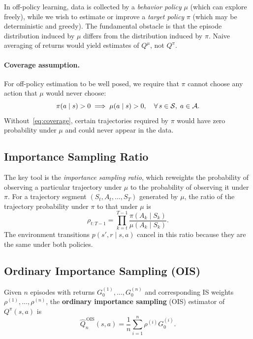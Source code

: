 In off-policy learning, data is collected by a \emph{behavior policy} $\mu$ (which can explore freely), while we wish to estimate or improve a \emph{target policy} $\pi$ (which may be deterministic and greedy).  The fundamental obstacle is that the episode distribution induced by $\mu$ differs from the distribution induced by $\pi$.  Naive averaging of returns would yield estimates of $Q^\mu$, not $Q^\pi$.

\paragraph{Coverage assumption.}
For off-policy estimation to be well posed, we require that $\pi$ cannot choose any action that $\mu$ would never choose:
\begin{equation}
  \label{eq:coverage}
  \pi(a \mid s) > 0 \implies \mu(a \mid s) > 0, \quad \forall\, s \in \mathcal{S},\; a \in \mathcal{A}.
\end{equation}
Without~\eqref{eq:coverage}, certain trajectories required by $\pi$ would have zero probability under $\mu$ and could never appear in the data.

\subsection*{Importance Sampling Ratio}

The key tool is the \emph{importance sampling ratio}, which reweights the probability of observing a particular trajectory under $\mu$ to the probability of observing it under $\pi$.  For a trajectory segment $(S_t, A_t, \dots, S_T)$ generated by $\mu$, the ratio of the trajectory probability under $\pi$ to that under $\mu$ is
\begin{equation}
  \label{eq:is-ratio}
  \rho_{t:T-1} = \prod_{k=t}^{T-1} \frac{\pi(A_k \mid S_k)}{\mu(A_k \mid S_k)}.
\end{equation}
The environment transitions $p(s', r \mid s, a)$ cancel in this ratio because they are the same under both policies.

\subsection*{Ordinary Importance Sampling (OIS)}

\begin{definition}
\label{def:ois}
Given $n$ episodes with returns $G_0^{(1)}, \dots, G_0^{(n)}$ and corresponding IS weights $\rho^{(1)}, \dots, \rho^{(n)}$, the \textbf{ordinary importance sampling} (OIS) estimator of $Q^\pi(s, a)$ is
\begin{equation}
  \label{eq:ois-estimator}
  \widehat{Q}_n^{\,\mathrm{OIS}}(s, a) = \frac{1}{n} \sum_{i=1}^{n} \rho^{(i)} G_0^{(i)}.
\end{equation}
\end{definition}

